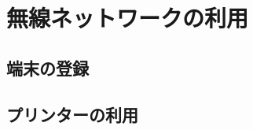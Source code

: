 \documentclass[main]{subfiles}
\begin{document}
\chapter{無線ネットワークの利用}
\section{端末の登録}
\section{プリンターの利用}
\fontsize{10.2}{10} \selectfont
\end{document}
